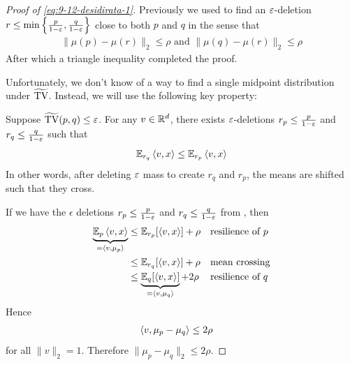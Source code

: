 \begin{proof}[Proof of \cref{eq:9-12-desidirata-1}]
    Previously we used  to find an $\varepsilon$-deletion
    $r \leq \min\left\{\frac{p}{1 - \varepsilon}, \frac{q}{1 - \varepsilon}\right\}$
    close to both $p$ and $q$ in the sense that
    \begin{align}
            \| \mu(p) - \mu(r) \|_2 \leq \rho
            \text{ and }
            \|\mu(q) - \mu(r) \|_2 \leq \rho
    \end{align}
    After which a triangle inequality completed the proof.

    Unfortunately, we don't know of a way to find a single midpoint distribution
    under $\widetilde{\operatorname{TV}}$.  Instead, we will use the following key property:

    \begin{lemma}\label{lem:mean-crossing-property}
        Suppose $\widetilde{\operatorname{TV}}(p,q) \leq \varepsilon$.
        For any $v \in \mathbb{R}^d$, there exists $\varepsilon$-deletions $r_p \leq \frac{p}{1 - \varepsilon}$ and $r_q \leq \frac{q}{1 - \varepsilon}$ such that
        \begin{align}
            \mathbb{E}_{r_q} \braket{v,x} \leq \mathbb{E}_{r_p} \braket{v,x}
        \end{align}
        In other words, after deleting $\varepsilon$ mass to create $r_q$ and $r_p$, the
        means are shifted such that they cross.
    \end{lemma}

    If we have the $\epsilon$ deletions
    $r_p \leq \frac{p}{1 - \varepsilon}$ and $r_q \leq \frac{q}{1 - \varepsilon}$ from
    , then
    \begin{align}
        \underbrace{\mathbb{E}_p \braket{v,x}}_{=\braket{v, \mu_p}}
        &\leq \mathbb{E}_{r_p}[\braket{v,x}] + \rho &&\text{resilience of $p$} \\
        &\leq \mathbb{E}_{r_q}[\braket{v,x}] + \rho &&\text{mean crossing} \\
        &\leq \underbrace{\mathbb{E}_{q}[\braket{v,x}]}_{=\braket{v, \mu_q}} + 2\rho &&\text{resilience of $q$}
    \end{align}
    Hence
    \begin{align}
        \braket{v, \mu_p - \mu_q}
        &\leq 2 \rho
    \end{align}
    for all $\|v\|_2 = 1$. Therefore $\|\mu_p - \mu_q\|_2 \leq 2 \rho$.
\end{proof}

